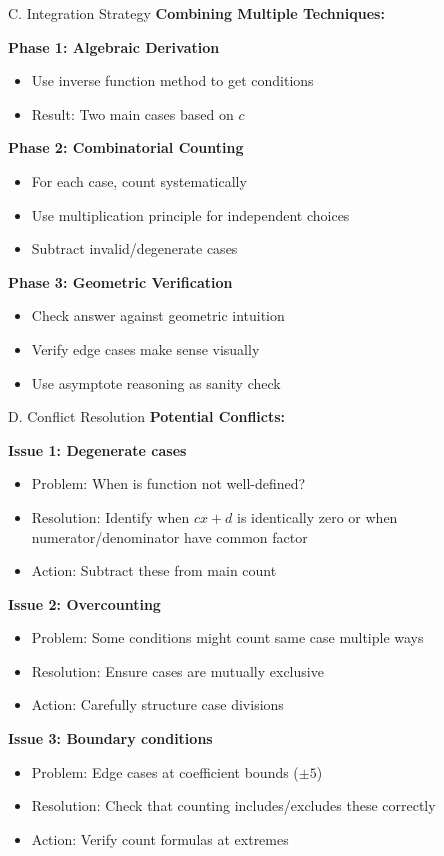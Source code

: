 \documentclass[12pt]{article}
\begin{document}
\begin{conversionbox}{C. Integration Strategy}
\textbf{Combining Multiple Techniques:}

\textbf{Phase 1: Algebraic Derivation}
\begin{itemize}
    \item Use inverse function method to get conditions
    \item Result: Two main cases based on $c$
\end{itemize}

\textbf{Phase 2: Combinatorial Counting}
\begin{itemize}
    \item For each case, count systematically
    \item Use multiplication principle for independent choices
    \item Subtract invalid/degenerate cases
\end{itemize}

\textbf{Phase 3: Geometric Verification}
\begin{itemize}
    \item Check answer against geometric intuition
    \item Verify edge cases make sense visually
    \item Use asymptote reasoning as sanity check
\end{itemize}
\end{conversionbox}

\begin{conversionbox}{D. Conflict Resolution}
\textbf{Potential Conflicts:}

\textbf{Issue 1: Degenerate cases}
\begin{itemize}
    \item Problem: When is function not well-defined?
    \item Resolution: Identify when $cx+d$ is identically zero or when numerator/denominator have common factor
    \item Action: Subtract these from main count
\end{itemize}

\textbf{Issue 2: Overcounting}
\begin{itemize}
    \item Problem: Some conditions might count same case multiple ways
    \item Resolution: Ensure cases are mutually exclusive
    \item Action: Carefully structure case divisions
\end{itemize}

\textbf{Issue 3: Boundary conditions}
\begin{itemize}
    \item Problem: Edge cases at coefficient bounds ($\pm 5$)
    \item Resolution: Check that counting includes/excludes these correctly
    \item Action: Verify count formulas at extremes
\end{itemize}
\end{conversionbox}
\end{document}
